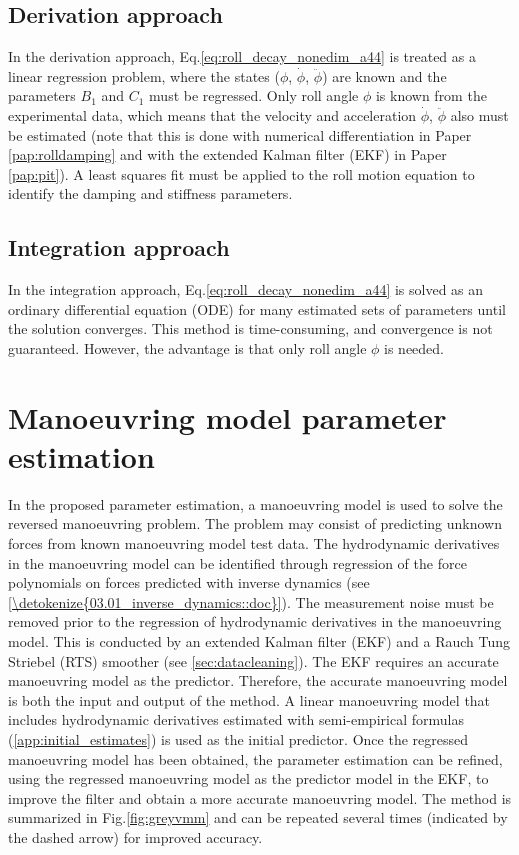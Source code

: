 \subsection{Derivation approach}\label{sec:derivation_approach}
In the derivation approach, Eq.\ref{eq:roll_decay_nonedim_a44} is treated as a linear regression problem, where the states ($\phi$, $\dot{\phi}$, $\ddot{\phi}$) are known and the parameters $B_1$ and $C_1$ must be regressed. Only roll angle $\phi$ is known from the experimental data, which means that the velocity and acceleration $\dot{\phi}$, $\ddot{\phi}$ also must be estimated (note that this is done with numerical differentiation in Paper \ref{pap:rolldamping} and with the extended Kalman filter (EKF) in Paper \ref{pap:pit}).
A least squares fit must be applied to the roll motion equation to identify the damping and stiffness parameters.

\subsection{Integration approach}\label{sec:integration_approach}
In the integration approach, Eq.\ref{eq:roll_decay_nonedim_a44} is solved as an ordinary differential equation (ODE) for many estimated sets of parameters until the solution converges. This method is time-consuming, and convergence is not guaranteed. However, the advantage is that only roll angle $\phi$ is needed.

\section{Manoeuvring model parameter estimation} \label{sec:_VMM}
In the proposed parameter estimation, a manoeuvring model is used to solve the reversed manoeuvring problem. The problem may consist of predicting unknown forces from known manoeuvring model test data. The hydrodynamic derivatives in the manoeuvring model can be identified through regression of the force polynomials on forces predicted with inverse dynamics (see \autoref{\detokenize{03.01_inverse_dynamics::doc}}).
The measurement noise must be removed prior to the regression of hydrodynamic derivatives in the manoeuvring model. This is conducted by an extended Kalman filter (EKF) and a Rauch Tung Striebel (RTS) smoother (see \autoref{sec:datacleaning}). The EKF requires an accurate manoeuvring model as the predictor.
Therefore, the accurate manoeuvring model is both the input and output of the method. A linear manoeuvring model that includes hydrodynamic derivatives estimated with semi-empirical formulas (\autoref{app:initial_estimates}) is used as the initial predictor. Once the regressed manoeuvring model has been obtained, the parameter estimation can be refined, using the regressed manoeuvring model as the predictor model in the EKF, to improve the filter and obtain a more accurate manoeuvring model. The method is summarized in Fig.\ref{fig:greyvmm} and can be repeated several times (indicated by the dashed arrow) for improved accuracy. 

